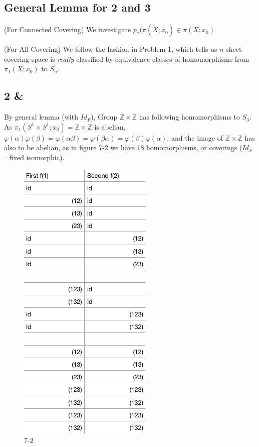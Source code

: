 \documentclass[11pt]{article}
\def\Z{{\mathbb Z}}
\theoremstyle{remark}
\begin{document}
\subsection*{General Lemma for 2 and 3}
  \indent (For Connected Covering) We investigate $p_*(\pi(\tilde{X};\tilde{x_0})\in \pi(X;x_0)$
  
  (For All Covering) We follow the fashion in Problem 1,  which tells us $n$-sheet covering space is \textit{really} classified by equivalence classes of homomorphisms from $\pi_1(X;x_0)$ to $S_n$. 
\subsection*{2 & }
    
    By general lemma (with $Id_F$), Group $\Z\times\Z$ has following homomorphisms to $S_3$: As $\pi_1(S^1\times S^1;x_0)=\Z\times\Z$ is abelian,   $\varphi(\alpha)\varphi(\beta)=\varphi(\alpha\beta)=\varphi(\beta\alpha)=\varphi(\beta)\varphi(\alpha)$, and the image of $\Z\times\Z$ has also to be abelian, as in figure 7-2 we have $18$ homomorphisms, or coverings ($Id_F$=fixed isomorphic).
    
    \begin{figure}[h!]
    \centering
    \includegraphics[scale=0.5]{7-2.png}
    \caption{7-2}
    \end{figure}
     
\end{document}
